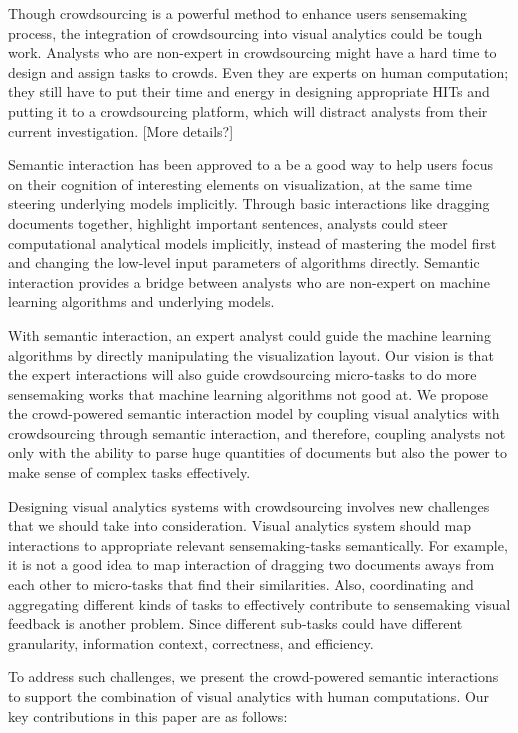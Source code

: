 \documentclass[journal]{vgtc}                %
\begin{document}
Though crowdsourcing is a powerful method to enhance users sensemaking process, the integration of crowdsourcing into visual analytics could be tough work. Analysts who are non-expert in crowdsourcing might have a hard time to design and assign tasks to crowds. Even they are experts on human computation; they still have to put their time and energy in designing appropriate HITs and putting it to a crowdsourcing platform, which will distract analysts from their current investigation. [More details?]

Semantic interaction\cite{Endert2014} has been approved to a be a good way to help users focus on their cognition of interesting elements on visualization, at the same time steering underlying models implicitly\cite{Endert2012}. Through basic interactions like dragging documents together, highlight important sentences, analysts could steer computational analytical models implicitly, instead of mastering the model first and changing the low-level input parameters of algorithms directly. Semantic interaction provides a bridge between analysts who are non-expert on machine learning algorithms and underlying models.

With semantic interaction, an expert analyst could guide the machine learning algorithms by directly manipulating the visualization layout. Our vision is that the expert interactions will also guide crowdsourcing micro-tasks to do more sensemaking works that machine learning algorithms not good at. We propose the crowd-powered semantic interaction model by coupling visual analytics with crowdsourcing through semantic interaction, and therefore, coupling analysts not only with the ability to parse huge quantities of documents but also the power to make sense of complex tasks effectively.

Designing visual analytics systems with crowdsourcing involves new challenges that we should take into consideration. Visual analytics system should map interactions to appropriate relevant sensemaking-tasks semantically. For example, it is not a good idea to map interaction of dragging two documents aways from each other to micro-tasks that find their similarities. Also, coordinating and aggregating different kinds of tasks to effectively contribute to sensemaking visual feedback is another problem. Since different sub-tasks could have different granularity, information context, correctness, and efficiency.

To address such challenges, we present the crowd-powered semantic interactions to support the combination of visual analytics with human computations. Our key contributions in this paper are as follows:
\end{document}

